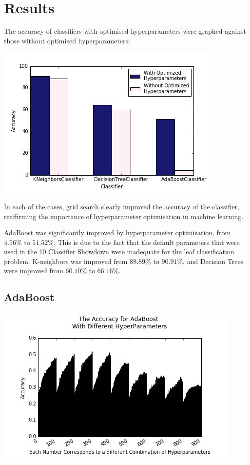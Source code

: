 \documentclass{article}
\begin{document}
\section{Results}

The accuracy of classifiers with optimised hyperparameters were graphed against those without optimised hyperparameters:

\includegraphics[scale=0.7]{acc_class}

In each of the cases, grid search clearly improved the accuracy of the classifier, reaffirming the importance of hyperparameter optimisation in machine learning. 

AdaBoost was significantly improved by hyperparameter optimisation, from $4.56\%$ to $51.52\%$. This is due to the fact that the default parameters that were used in the 10 Classifier Showdown \cite{showdown} were inadequate for the leaf classification problem. K-neighbors was improved from $88.89\%$ to $90.91\%$, and Decision Trees were improved from $60.10\%$ to $66.16\%$. 

\subsection{AdaBoost}

\includegraphics[scale=0.6]{adaboost_crop}
\end{document}
